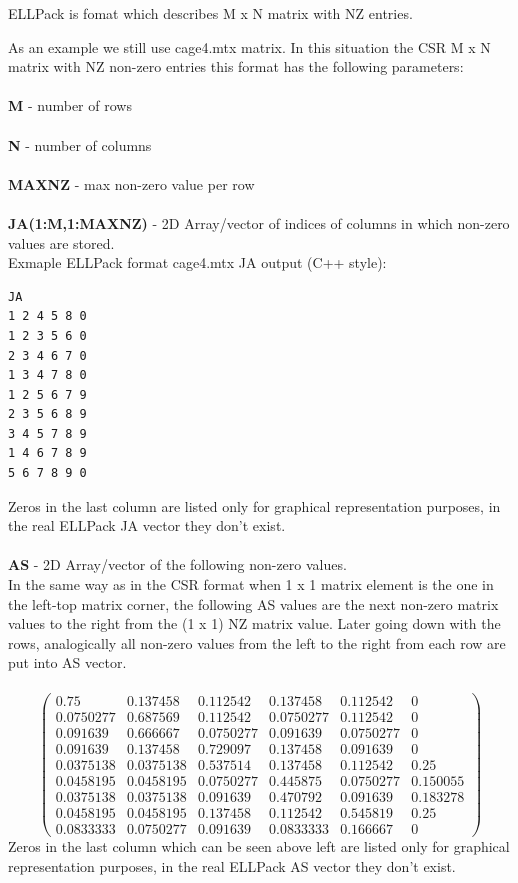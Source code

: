 \documentclass{scrreprt}
\begin{document}
ELLPack is fomat which describes M x N matrix with NZ entries.


  As an example we still use cage4.mtx matrix. In this situation the CSR M x N matrix with NZ non-zero entries this format has the following parameters:
\\
\\
\textbf{ M} - number of rows
 \\
 \\
\textbf{ N} - number of columns
 \\
 \\
 \textbf{MAXNZ} - max non-zero value per row
\\
\\
\textbf{JA(1:M,1:MAXNZ)} - 2D Array/vector of indices of columns in which non-zero values are stored.
\\
Exmaple ELLPack format cage4.mtx JA output (C++ style):

\begin{lstlisting}[language=TeX]
JA
1 2 4 5 8 0 
1 2 3 5 6 0 
2 3 4 6 7 0 
1 3 4 7 8 0 
1 2 5 6 7 9 
2 3 5 6 8 9 
3 4 5 7 8 9 
1 4 6 7 8 9 
5 6 7 8 9 0 

\end{lstlisting}
Zeros in the last column are listed only for graphical representation purposes, in the real ELLPack JA vector they don't exist.
\\
\\
\textbf{AS} - 2D Array/vector of the following non-zero values. 
\\
In the same way as in the CSR format when 1 x 1 matrix element is the one in the left-top matrix corner, the following AS values are the next non-zero matrix values to the right from the (1 x 1) NZ matrix value. Later going down with the rows, analogically all non-zero values from the left to the right from each row are put into AS vector.
\\ 
\\
\begin{equation} \label{eu_eqn}
\begin{pmatrix}
0.75      & 0.137458  & 0.112542  & 0.137458  & 0.112542  & 0        \\
0.0750277 & 0.687569  & 0.112542  & 0.0750277 & 0.112542  & 0        \\
0.091639  & 0.666667  & 0.0750277 & 0.091639  & 0.0750277 & 0        \\
0.091639  & 0.137458  & 0.729097  & 0.137458  & 0.091639  & 0        \\
0.0375138 & 0.0375138 & 0.537514  & 0.137458  & 0.112542  & 0.25     \\
0.0458195 & 0.0458195 & 0.0750277 & 0.445875  & 0.0750277 & 0.150055 \\
0.0375138 & 0.0375138 & 0.091639  & 0.470792  & 0.091639  & 0.183278 \\
0.0458195 & 0.0458195 & 0.137458  & 0.112542  & 0.545819  & 0.25     \\
0.0833333 & 0.0750277 & 0.091639  & 0.0833333 & 0.166667  & 0       
\end{pmatrix}
\end{equation}
Zeros in the last column which can be seen above left are listed only for graphical representation purposes, in the real ELLPack AS vector they don't exist.
\end{document}

